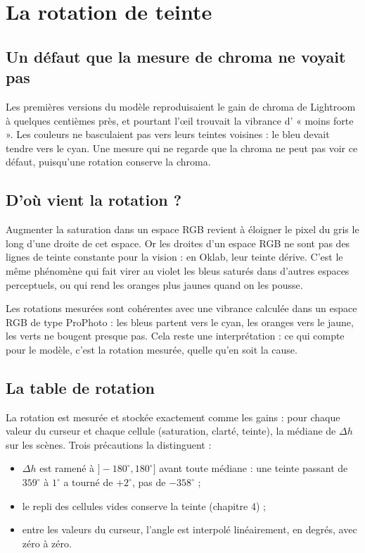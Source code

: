 \chapter{La rotation de teinte}

\section{Un défaut que la mesure de chroma ne voyait pas}
Les premières versions du modèle reproduisaient le gain de chroma de
Lightroom à quelques centièmes près, et pourtant l'œil trouvait la vibrance
d'\IPR{} « moins forte ». Les couleurs ne basculaient pas vers leurs teintes
voisines : le bleu devait tendre vers le cyan. Une mesure qui ne regarde que la
chroma ne peut pas voir ce défaut, puisqu'une rotation conserve la chroma.


\section{D'où vient la rotation ?}
Augmenter la saturation dans un espace RGB revient à éloigner le pixel du gris
le long d'une droite de cet espace. Or les droites d'un espace RGB ne sont pas
des lignes de teinte constante pour la vision : en Oklab, leur teinte dérive.
C'est le même phénomène qui fait virer au violet les bleus saturés dans
d'autres espaces perceptuels, ou qui rend les oranges plus jaunes quand on les
pousse.

Les rotations mesurées sont cohérentes avec une vibrance calculée dans un
espace RGB de type ProPhoto : les bleus partent vers le cyan, les oranges vers
le jaune, les verts ne bougent presque pas. Cela reste une interprétation : ce
qui compte pour le modèle, c'est la rotation mesurée, quelle qu'en soit la
cause.

\section{La table de rotation}
La rotation est mesurée et stockée exactement comme les gains : pour chaque
valeur du curseur et chaque cellule (saturation, clarté, teinte), la médiane
de $\Delta h$ sur les scènes. Trois précautions la distinguent :
\begin{itemize}
\item $\Delta h$ est ramené à $]-180^\circ,180^\circ]$ avant toute médiane :
une teinte passant de $359^\circ$ à $1^\circ$ a tourné de $+2^\circ$, pas de
$-358^\circ$ ;
\item le repli des cellules vides conserve la teinte (chapitre 4) ;
\item entre les valeurs du curseur, l'angle est interpolé linéairement, en
degrés, avec zéro à zéro.
\end{itemize}

